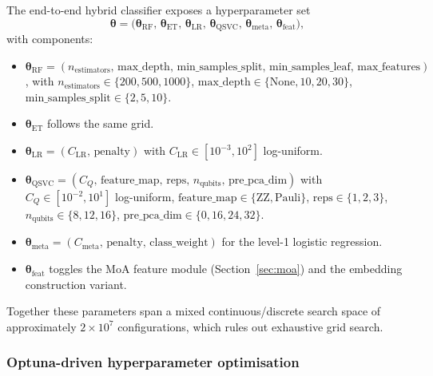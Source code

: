 \documentclass[twocolumn,10pt]{article}
\begin{document}
The end-to-end hybrid classifier exposes a hyperparameter set
\begin{equation}
\boldsymbol{\theta} = \bigl(\boldsymbol{\theta}_{\mathrm{RF}},\, \boldsymbol{\theta}_{\mathrm{ET}},\, \boldsymbol{\theta}_{\mathrm{LR}},\, \boldsymbol{\theta}_{\mathrm{QSVC}},\, \boldsymbol{\theta}_{\mathrm{meta}},\, \boldsymbol{\theta}_{\mathrm{feat}}\bigr),
\end{equation}
with components:
\begin{itemize}[leftmargin=*]
\item $\boldsymbol{\theta}_{\mathrm{RF}} = (n_{\mathrm{estimators}},\, \mathrm{max\_depth},\, \mathrm{min\_samples\_split},\, \mathrm{min\_samples\_leaf},\, \mathrm{max\_features})$, with $n_{\mathrm{estimators}} \in \{200, 500, 1000\}$, $\mathrm{max\_depth} \in \{\text{None}, 10, 20, 30\}$, $\mathrm{min\_samples\_split} \in \{2, 5, 10\}$.
\item $\boldsymbol{\theta}_{\mathrm{ET}}$ follows the same grid.
\item $\boldsymbol{\theta}_{\mathrm{LR}} = (C_{\mathrm{LR}},\, \text{penalty})$ with $C_{\mathrm{LR}} \in [10^{-3}, 10^{2}]$ log-uniform.
\item $\boldsymbol{\theta}_{\mathrm{QSVC}} = (C_{Q},\, \text{feature\_map},\, \text{reps},\, n_{\text{qubits}},\, \text{pre\_pca\_dim})$ with $C_{Q} \in [10^{-2}, 10^{1}]$ log-uniform, $\text{feature\_map} \in \{\mathrm{ZZ}, \mathrm{Pauli}\}$, $\text{reps} \in \{1, 2, 3\}$, $n_{\text{qubits}} \in \{8, 12, 16\}$, $\text{pre\_pca\_dim} \in \{0, 16, 24, 32\}$.
\item $\boldsymbol{\theta}_{\mathrm{meta}} = (C_{\mathrm{meta}},\, \text{penalty},\, \text{class\_weight})$ for the level-1 logistic regression.
\item $\boldsymbol{\theta}_{\mathrm{feat}}$ toggles the MoA feature module (Section~\ref{sec:moa}) and the embedding construction variant.
\end{itemize}
Together these parameters span a mixed continuous/discrete search space of approximately $2 \times 10^{7}$ configurations, which rules out exhaustive grid search.

\subsubsection*{Optuna-driven hyperparameter optimisation}
\end{document}
